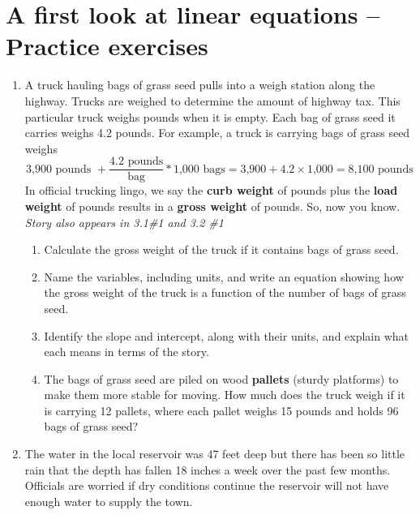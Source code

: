 
\section{A first look at linear equations -- Practice exercises}

\begin{enumerate}

\item A truck hauling bags of grass seed pulls into a weigh station along the highway.  Trucks are weighed to determine the amount of highway tax.  This particular truck weighs  pounds when it is empty.  Each bag of grass seed it carries weighs 4.2 pounds. 
For example, a truck is carrying  bags of grass seed weighs 
$$\text{3,900 pounds } + \frac{4.2 \text{ pounds}}{\text{bag}} \ast \text{1,000  bags} = \text{3,900} + 4.2\times\text{1,000}=\text{8,100 pounds}$$ 
In official trucking lingo, we  say the \textbf{curb weight} of  pounds plus the \textbf{load weight} of  pounds results in a \textbf{gross weight} of  pounds.  So, now you know.  \hfill \emph{Story also appears in 3.1\#1 and 3.2 \#1}
\begin{enumerate}
\item Calculate the gross weight of the truck if it contains  bags of grass seed.   \vfill
\item Name the variables, including units, and  write an equation showing how the gross weight of the truck is a function of the number of bags of grass seed.  \vfill
\item Identify the slope and intercept, along with their units, and explain what each means in terms of the story. \vfill
\item The bags of grass seed are piled on wood \textbf{pallets} (sturdy platforms) to make them more stable for moving. How much does the truck weigh if it is carrying 12 pallets, where each pallet weighs 15 pounds and holds 96 bags of grass seed?    \vfill
\end{enumerate}

\newpage %

\item The water in the local reservoir was 47 feet deep but there has been so little rain that the depth has fallen 18 inches a week over the past few months.  Officials are worried if dry conditions continue the reservoir will not have enough water to supply the town.  


\end{enumerate}
